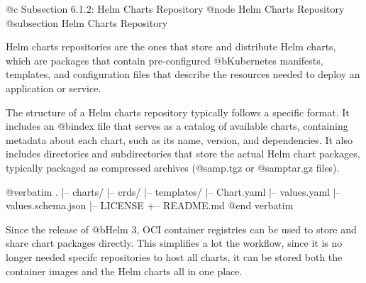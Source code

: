 @c Subsection 6.1.2: Helm Charts Repository
@node Helm Charts Repository
@subsection Helm Charts Repository

Helm charts repositories are the ones that store and distribute Helm charts, which are packages that contain pre-configured @b{Kubernetes manifests}, templates, and configuration files that describe the resources needed to deploy an application or service.

The structure of a Helm charts repository typically follows a specific format. It includes an @b{index file} that serves as a catalog of available charts, containing metadata about each chart, such as its name, version, and dependencies. It also includes directories and subdirectories that store the actual Helm chart packages, typically packaged as compressed archives (@samp{.tgz} or @samp{tar.gz} files).

@verbatim
.
|-- charts/
|-- crds/
|-- templates/
|-- Chart.yaml
|-- values.yaml
|-- values.schema.json
|-- LICENSE
+-- README.md
@end verbatim

Since the release of @b{Helm 3}, OCI container registries can be used to store and share chart packages directly. This simplifies a lot the workflow, since it is no longer needed specifc repositories to host all charts, it can be stored both the container images and the Helm charts all in one place.
